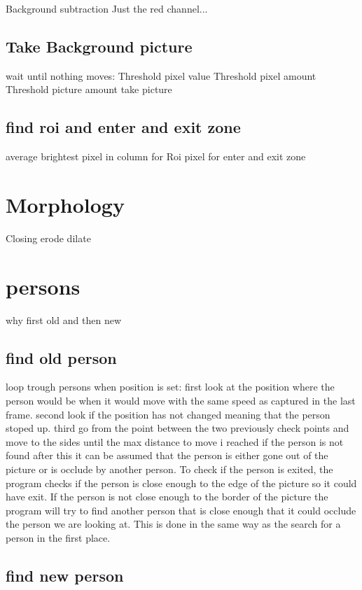 Background subtraction
Just the red channel...
\subsection{Take Background picture}
wait until nothing moves:
	Threshold pixel value
	Threshold pixel amount
	Threshold picture amount
take picture
\subsection{find roi and enter and exit zone}
average brightest pixel in column for Roi
pixel for enter and exit zone







\section{Morphology}
Closing
	erode
	dilate
	
\section{persons}
why first old and then new
\subsection{find old person}
loop trough persons
when position is set:
	first look at the position where the person would be when it would move with the same speed as captured in the last frame.
	second look if the position has not changed meaning that the person stoped up.
	third go from the point between the two previously check points and move to the sides until the max distance to move i reached
	if the person is not found after this it can be assumed that the person is either gone out of the picture or is occlude by another person. To check if the person is exited, the program checks if the person is close enough to the edge of the picture so it could have exit. If the person is not close enough to the border of the  picture the program will try to find another person that is close enough that it could occlude the person we are looking at.  This is done in the same way as the search for a person in the first place.
	
\subsection{find new person}

